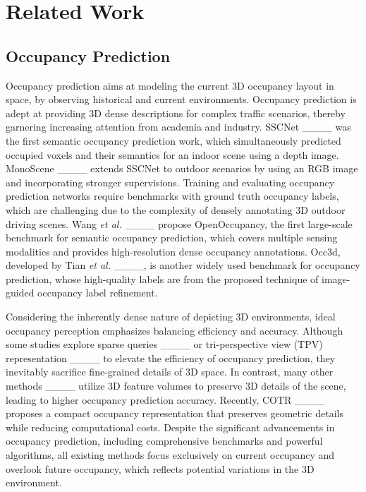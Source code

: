 \section{Related Work}

\vspace{-5pt}
\subsection{Occupancy Prediction}
\vspace{-5pt}

Occupancy prediction aims at modeling the current 3D occupancy layout in space, by observing historical and current environments. Occupancy prediction is adept at providing 3D dense descriptions for complex traffic scenarios, thereby garnering increasing attention from academia and industry. SSCNet ____ was the first semantic occupancy prediction work, which simultaneously predicted occupied voxels and their semantics for an indoor scene using a depth image. MonoScene ____ extends SSCNet to outdoor scenarios by using an RGB image and incorporating stronger supervisions. Training and evaluating occupancy prediction networks require benchmarks with ground truth occupancy labels, which are challenging due to the complexity of densely annotating 3D outdoor driving scenes. Wang \textit{et al.} ____ propose OpenOccupancy, the first large-scale benchmark for semantic occupancy prediction, which covers multiple sensing modalities and provides high-resolution dense occupancy annotations. Occ3d, developed by Tian \textit{et al.} ____, is another widely used benchmark for occupancy prediction, whose high-quality labels are from the proposed technique of image-guided occupancy label refinement.

Considering the inherently dense nature of depicting 3D environments, ideal occupancy perception emphasizes balancing efficiency and accuracy. Although some studies explore sparse queries ____ or tri-perspective view (TPV) representation ____ to elevate the efficiency of occupancy prediction, they inevitably sacrifice fine-grained details of 3D space. In contrast, many other methods ____ utilize 3D feature volumes to preserve 3D details of the scene, leading to higher occupancy prediction accuracy. Recently, COTR ____ proposes a compact occupancy representation that preserves geometric details while reducing computational costs. Despite the significant advancements in occupancy prediction, including comprehensive benchmarks and powerful algorithms, all existing methods focus exclusively on current occupancy and overlook future occupancy, which reflects potential variations in the 3D environment.

